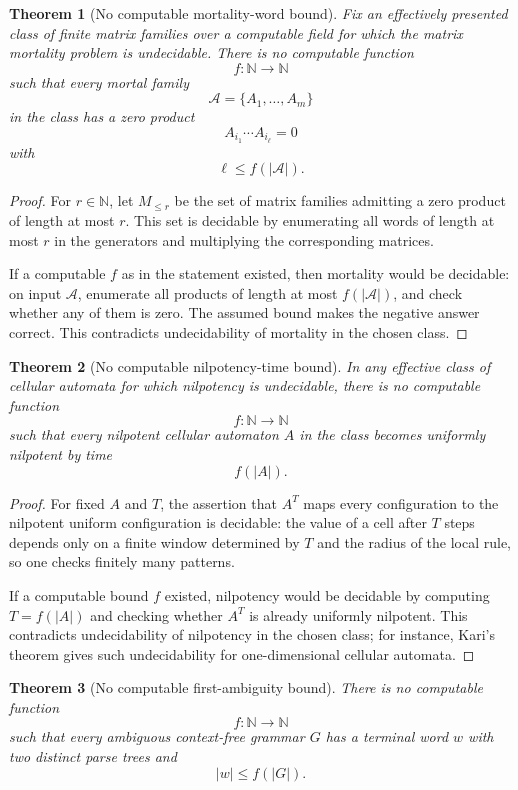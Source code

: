 \documentclass[11pt]{article}
\newtheorem{theorem}{Theorem}[section]
\begin{document}
\begin{theorem}[No computable mortality-word bound]
Fix an effectively presented class of finite matrix families over a computable field for which the matrix mortality problem is undecidable. There is no computable function
\[
f:\mathbb N\to\mathbb N
\]
such that every mortal family
\[
\mathcal A=\{A_1,\ldots,A_m\}
\]
in the class has a zero product
\[
A_{i_1}\cdots A_{i_\ell}=0
\]
with
\[
\ell\leq f(|\mathcal A|).
\]
\end{theorem}

\begin{proof}
For \(r\in\mathbb N\), let \(M_{\leq r}\) be the set of matrix families admitting a zero product of length at most \(r\). This set is decidable by enumerating all words of length at most \(r\) in the generators and multiplying the corresponding matrices.

If a computable \(f\) as in the statement existed, then mortality would be decidable: on input \(\mathcal A\), enumerate all products of length at most \(f(|\mathcal A|)\), and check whether any of them is zero. The assumed bound makes the negative answer correct. This contradicts undecidability of mortality in the chosen class.
\end{proof}

\begin{theorem}[No computable nilpotency-time bound]
In any effective class of cellular automata for which nilpotency is undecidable, there is no computable function
\[
f:\mathbb N\to\mathbb N
\]
such that every nilpotent cellular automaton \(A\) in the class becomes uniformly nilpotent by time
\[
f(|A|).
\]
\end{theorem}

\begin{proof}
For fixed \(A\) and \(T\), the assertion that \(A^T\) maps every configuration to the nilpotent uniform configuration is decidable: the value of a cell after \(T\) steps depends only on a finite window determined by \(T\) and the radius of the local rule, so one checks finitely many patterns.

If a computable bound \(f\) existed, nilpotency would be decidable by computing \(T=f(|A|)\) and checking whether \(A^T\) is already uniformly nilpotent. This contradicts undecidability of nilpotency in the chosen class; for instance, Kari's theorem gives such undecidability for one-dimensional cellular automata.
\end{proof}

\begin{theorem}[No computable first-ambiguity bound]
There is no computable function
\[
f:\mathbb N\to\mathbb N
\]
such that every ambiguous context-free grammar \(G\) has a terminal word \(w\) with two distinct parse trees and
\[
|w|\leq f(|G|).
\]
\end{theorem}
\end{document}
